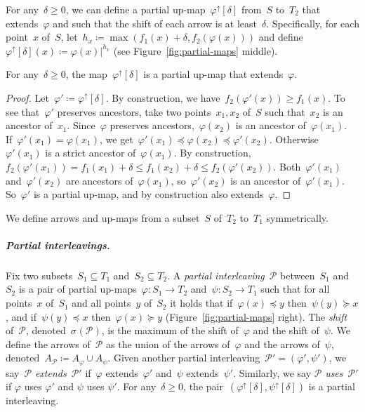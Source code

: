\documentclass[a4paper,UKenglish, autoref, thm-restate, cleveref]{lipics-v2021}
\newcommand{\an}[2]{#1|^{#2}}
\newcommand{\shift}[1]{\sigma_{#1}}
\renewcommand{\phi}{\varphi}
\renewcommand{\P}{\mathcal{P}}
\begin{document}
For any~$\delta \ge 0$, we can define a partial up-map~$\phi^\uparrow[\delta]$ from~$S$ to~$T_2$ that extends~$\phi$ and such that the shift of each arrow is at least~$\delta$.
Specifically, for each point~$x$ of~$S$, let~$h_x \coloneqq \max(f_1(x) +\delta, f_2(\phi(x)))$ and define~$\phi^\uparrow[\delta](x) \coloneqq \an{\phi(x)}{h_x}$ (see Figure~\ref{fig:partial-maps} middle).

\begin{lemma}\label{lem:lifted}
	For any~$\delta \ge 0$, the map~$\phi^\uparrow[\delta]$ is a partial up-map that extends~$\phi$.
\end{lemma}
\begin{proof}
    Let~$\phi' \coloneqq \phi^\uparrow[\delta]$.
    By construction, we have~$f_2(\phi'(x)) \ge f_1(x)$.
	To see that~$\phi'$ preserves ancestors, take two points~$x_1, x_2$ of~$S$ such that~$x_2$ is an ancestor of~$x_1$.
	Since~$\phi$ preserves ancestors,~$\phi(x_2)$ is an ancestor of~$\phi(x_1)$.
	If~$\phi'(x_1) = \phi(x_1)$, we get~${\phi'(x_1) \preceq \phi(x_2) \preceq \phi'(x_2)}$.
	Otherwise~$\phi'(x_1)$ is a strict ancestor of~$\phi(x_1)$.
	By construction,~$f_2(\phi'(x_1)) = f_1(x_1) + \delta \le f_1(x_2) + \delta \le f_2(\phi'(x_2))$.
	Both~$\phi'(x_1)$ and~$\phi'(x_2)$ are ancestors of~$\phi(x_1)$, so~$\phi'(x_2)$ is an ancestor of~$\phi'(x_1)$.
	So~$\phi'$ is a partial up-map, and by construction also extends~$\phi$.
\end{proof}

\noindent
We define arrows and up-maps from a subset~$S$ of~$T_2$ to~$T_1$ symmetrically.

\subparagraph{Partial interleavings.}
Fix two subsets~$S_1 \subseteq T_1$ and~$S_2 \subseteq T_2$.
A \emph{partial interleaving}~$\P$ between~$S_1$ and~$S_2$ is a pair of partial up-maps~$\phi \colon S_1 \to T_2$ and~$\psi \colon S_2 \to T_1$ such that for all points~$x$ of~$S_1$ and all points~$y$ of~$S_2$ it holds that if~$\phi(x) \preceq y$ then~$\psi(y) \succeq x$, and if~$\psi(y) \preceq x$ then~$\phi(x) \succeq y$ (Figure~\ref{fig:partial-maps} right).
The \emph{shift} of~$\P$, denoted~$\shift{}(\P)$, is the maximum of the shift of~$\phi$ and the shift of~$\psi$.
We define the arrows of~$\P$ as the union of the arrows of~$\phi$ and the arrows of~$\psi$, denoted~$A_\P \coloneqq A_\phi \cup A_\psi$.
Given another partial interleaving~$\P' = (\phi', \psi')$, we say~$\P$ \emph{extends}~$\P'$ if~$\phi$ extends~$\phi'$ and~$\psi$ extends~$\psi'$.
Similarly, we say $\P$ \emph{uses}~$\P'$ if $\phi$ uses $\phi'$ and $\psi$ uses $\psi'$.
For any~$\delta \ge 0$, the pair~$(\phi^\uparrow[\delta], \psi^\uparrow[\delta])$ is a partial interleaving.
\end{document}
